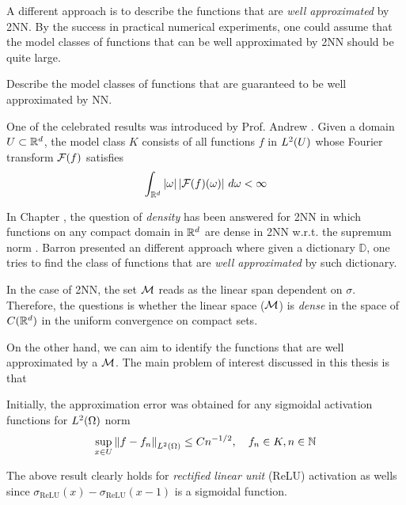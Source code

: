 
A different approach is to describe the functions that are \textit{well
approximated} by 2NN. By the success in practical numerical experiments, one
could assume that the model classes of functions that can be well approximated
by 2NN should be quite large. 
\begin{problem}
    \label{problem:2}
    Describe the model classes of functions that are guaranteed to be well
    approximated by NN.
\end{problem}


One of the celebrated results was introduced by Prof. Andrew
\cite{barronApproximationEstimationBounds1994}. Given a domain $U \subset \mathbb{R}^d$,
the model class $K$ consists of all functions $f$ in $L^{2}(U)$ whose Fourier
transform $\mathcal{F}(f)$ satisfies
\begin{equation}
    \int_{\mathbb{R}^d} \left| \omega \right| \left| \mathcal{F}(f)(\omega) \right| \,d\omega < \infty
\end{equation}

In Chapter \TODO, the question of
\textit{density} has been answered for 2NN in which functions on any compact
domain in $\mathbb{R}^d$ are dense in 2NN w.r.t. the supremum norm . Barron presented an
different approach where given a dictionary $\mathbb{D}$, one tries to find the
class of functions that are \textit{well approximated} by such dictionary. 

In the case of 2NN, the set $\mathcal{M}$ reads as the linear span dependent on
$\sigma$. Therefore, the questions is whether the linear space ($\mathcal{M}$) is
\textit{dense} in the space of $C(\mathbb{R}^d)$ in the uniform convergence on compact
sets.

On the other hand, we can aim to identify the functions that are well
approximated by a $\mathcal{M}$. The main problem of interest discussed in this
thesis is that

Initially, the approximation error was obtained for any sigmoidal activation
functions for $L^{2}(\Omega)$ norm 
\begin{equation}
    \sup_{x \in U} \left\| f - f_n \right\|_{L^{2}(\Omega)} \leq C n^{-1/2}, \quad 
    f_n \in K, n \in \mathbb{N}
\end{equation}

The above result clearly holds for \textit{rectified linear unit} (ReLU)
activation as wells since $\sigma_{\text{ReLU}}(x) - \sigma_{\text{ReLU}}(x-1)$
is a sigmoidal function.

